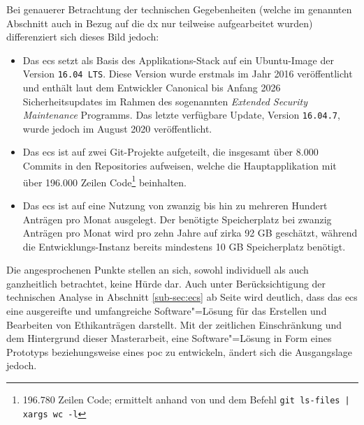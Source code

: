 \documentclass[a4paper,12pt,twoside]{scrreprt}
\begin{document}
Bei genauerer Betrachtung der technischen Gegebenheiten (welche im genannten Abschnitt auch in Bezug auf die \ac{dx} nur teilweise aufgearbeitet wurden) differenziert sich dieses Bild jedoch:
\begin{itemize}
    \item Das \ac{ecs} setzt als Basis des Applikations-Stack auf ein Ubuntu-Image der Version \texttt{16.04 LTS}. Diese Version wurde erstmals im Jahr 2016 veröffentlicht und enthält laut dem Entwickler Canonical bis Anfang 2026 Sicherheitsupdates im Rahmen des sogenannten \textit{Extended Security Maintenance} Programms. Das letzte verfügbare Update, Version \texttt{16.04.7}, wurde jedoch im August 2020 veröffentlicht. \cite{medizinische_universitat_wien_ecs-handbook_development-2021, canonical_ltd_ubuntu_2023, canonical_ltd_ubuntu_2023-1}
    \item Das \ac{ecs} ist auf zwei Git-Projekte aufgeteilt, die insgesamt über 8.000 Commits in den Repositories aufweisen, welche die Hauptapplikation mit über 196.000 Zeilen Code\footnote{196.780 Zeilen Code; ermittelt anhand von \cite{ethics_commission_system_organization_ecs_2021} und dem Befehl \texttt{git ls-files | xargs wc -l}} beinhalten. \cite{medizinische_universitat_wien_development_2021, ethics_commission_system_organization_ecs_2021, ethics_commission_system_organization_ecs-appliance_2021}
    \item Das \ac{ecs} ist auf eine Nutzung von zwanzig bis hin zu mehreren Hundert Anträgen pro Monat ausgelegt. Der benötigte Speicherplatz bei zwanzig Anträgen pro Monat wird pro zehn Jahre auf zirka 92 GB geschätzt, während die Entwicklungs-Instanz bereits mindestens 10 GB Speicherplatz benötigt. \cite{medizinische_universitat_wien_ecs-handbook_requirements-2021, ethics_commission_system_organization_ecs_2021}
\end{itemize}

Die angesprochenen Punkte stellen an sich, sowohl individuell als auch ganzheitlich betrachtet, keine Hürde dar. Auch unter Berücksichtigung der technischen Analyse in Abschnitt \ref{sub-sec:ecs} ab Seite \pageref{sub-sec:ecs} wird deutlich, dass das \acl{ecs} eine ausgereifte und umfangreiche Software"=Lösung für das Erstellen und Bearbeiten von Ethikanträgen darstellt. Mit der zeitlichen Einschränkung und dem Hintergrund dieser Masterarbeit, eine Software"=Lösung in Form eines Prototyps beziehungsweise eines \ac{poc} zu entwickeln, ändert sich die Ausgangslage jedoch.
\end{document}
